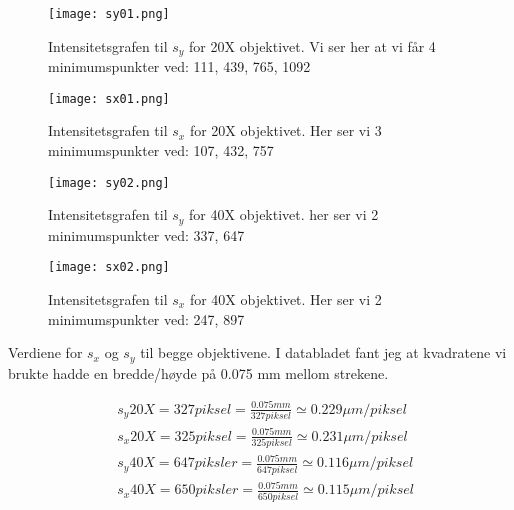 \documentclass[norsk,a4paper,12pt]{article}
\begin{document}
\begin{figure}
	\begin{center}
  	\texttt{[image: sy01.png]}\\
	\caption[Intensitetsgrafen til $s_y$ for 20X objektivet]{Intensitetsgrafen til $s_y$ for 20X objektivet. Vi ser her at vi får 4 minimumspunkter ved: 111, 439, 765, 1092}
	\label{sy01}
	\end{center}
\end{figure}
\begin{figure}
	\begin{center}
  	\texttt{[image: sx01.png]}\\
	\caption[Intensitetsgrafen til $s_x$ for 20X objektivet]{Intensitetsgrafen til $s_x$ for 20X objektivet. Her ser vi 3 minimumspunkter ved: 107, 432, 757 }
	\label{sx01}
	\end{center}
\end{figure}
\begin{figure}
	\begin{center}
  	\texttt{[image: sy02.png]}\\
	\caption[Intensitetsgrafen til $s_y$ for 40X objektivet]{Intensitetsgrafen til $s_y$ for 40X objektivet. her ser vi 2 minimumspunkter ved: 337, 647}
	\label{sy02}
	\end{center}
\end{figure}
\begin{figure}
	\begin{center}
  	\texttt{[image: sx02.png]}\\
	\caption[Intensitetsgrafen til $s_x$ for 40X objektivet]{Intensitetsgrafen til $s_x$ for 40X objektivet. Her ser vi 2 minimumspunkter ved: 247, 897}
	\label{sx02}
	\end{center}
\end{figure}

\begin{table}
\caption[verdier for $s_x$ og $s_y$]{Verdiene for $s_x$ og $s_y$ til begge objektivene. I databladet fant jeg at kvadratene vi brukte hadde en bredde/høyde på 0.075 mm mellom strekene. }
	\begin{align*}
	&s_y20X = 327 piksel = \frac{0.075mm}{327 piksel} \simeq 0.229\mu m/piksel\\
	&s_x20X=325piksel =  \frac{0.075mm}{325 piksel} \simeq 0.231\mu m/piksel \\ 
	&s_y40X = 647 piksler = \frac{0.075mm}{647 piksel} \simeq 0.116\mu m/piksel \\ 
	&s_x40X = 650 piksler = \frac{0.075mm}{650 piksel} \simeq 0.115\mu m/piksel \\ 
	\end{align*}
\label{verdier}
\end{table}
\end{document}
